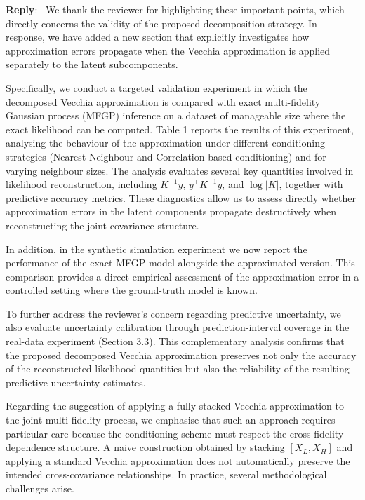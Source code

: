 \documentclass[12pt]{article}
\newcommand{\0}{\mathbf{0}}
\newcounter{reviewer}
\newcounter{point}[reviewer]
\newenvironment{reply}
   {\medskip \noindent \begin{sf}\color{Blue}\textbf{Reply}:\  }
   {\medskip \end{sf}}
\begin{document}
\begin{reply}
We thank the reviewer for highlighting these important points, which directly concerns the validity of the proposed decomposition strategy. In response, we have added a new section that explicitly investigates how approximation errors propagate when the Vecchia approximation is applied separately to the latent subcomponents.

Specifically, we conduct a targeted validation experiment in which the decomposed Vecchia approximation is compared with exact multi-fidelity Gaussian process (MFGP) inference on a dataset of manageable size where the exact likelihood can be computed. Table 1 reports the results of this experiment, analysing the behaviour of the approximation under different conditioning strategies (Nearest Neighbour and Correlation-based conditioning) and for varying neighbour sizes. The analysis evaluates several key quantities involved in likelihood reconstruction, including $K^{-1}y$, $y^\top K^{-1}y$, and $\log |K|$, together with predictive accuracy metrics. These diagnostics allow us to assess directly whether approximation errors in the latent components propagate destructively when reconstructing the joint covariance structure.

In addition, in the synthetic simulation experiment we now report the performance of the exact MFGP model alongside the approximated version. This comparison provides a direct empirical assessment of the approximation error in a controlled setting where the ground-truth model is known.

To further address the reviewer’s concern regarding predictive uncertainty, we also evaluate uncertainty calibration through prediction-interval coverage in the real-data experiment (Section 3.3). This complementary analysis confirms that the proposed decomposed Vecchia approximation preserves not only the accuracy of the reconstructed likelihood quantities but also the reliability of the resulting predictive uncertainty estimates.

Regarding the suggestion of applying a fully stacked Vecchia approximation to the joint multi-fidelity process, we emphasise that such an approach requires particular care because the conditioning scheme must respect the cross-fidelity dependence structure. A naive construction obtained by stacking $[X_L, X_H]$ and applying a standard Vecchia approximation does not automatically preserve the intended cross-covariance relationships. In practice, several methodological challenges arise.


\end{reply}
\end{document}
